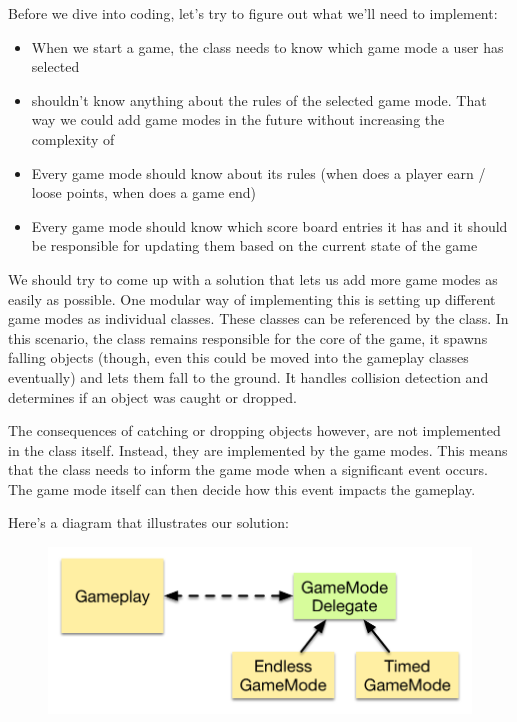 Before we dive into coding, let's try to figure out what we'll need to
implement:
\begin{itemize}
  \item When we start a game, the  class needs to know
  which game mode a user has selected
  \item {} shouldn't know
  anything about the rules of the selected game mode. That way we could add game
  modes in the future without increasing the complexity of
  \item Every game mode should know about its rules (when does a player earn /
  loose points, when does a game end)
  \item Every game mode should know which score board entries it has and it
  should be responsible for updating them based on the current state of the game
\end{itemize}

We should try to come up with a solution that lets us add more game modes as
easily as possible. One modular way of implementing this is setting up different
game modes as individual classes. These classes can be referenced by the
 class. In this scenario, the  class
remains responsible for the core of the game, it spawns falling objects (though,
even this could be moved into the gameplay classes eventually) and lets them
fall to the ground. It handles collision detection and determines if an object
was caught or dropped.

The consequences of catching or dropping objects however, are not implemented in
the  class itself. Instead, they are implemented by the
game modes. This means that the  class needs to inform the
game mode when a significant event occurs. The game mode itself can then decide
how this event impacts the gameplay.

Here's a diagram that illustrates our solution:

\begin{figure}[H]
    \centering
    \includegraphics[width=0.5\linewidth]{images/Chapter7/gameplay_design.png}
\end{figure}

